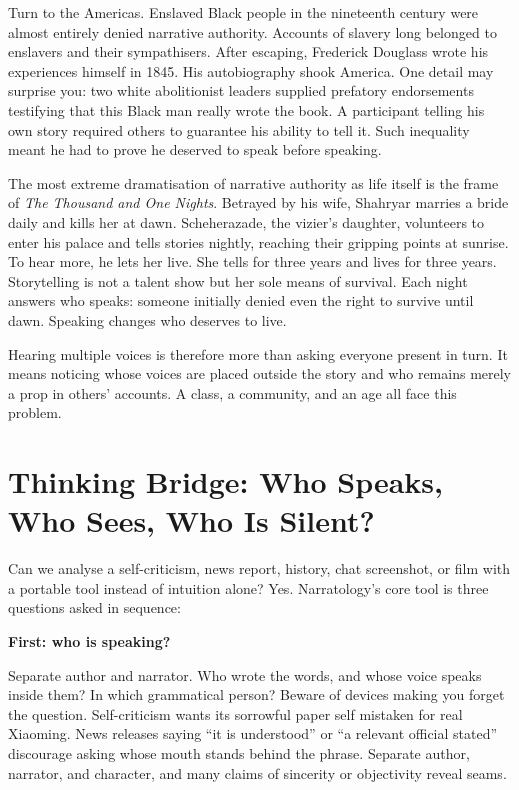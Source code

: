 Turn to the Americas. Enslaved Black people in the nineteenth century were almost entirely denied narrative authority. Accounts of slavery long belonged to enslavers and their sympathisers. After escaping, Frederick Douglass wrote his experiences himself in 1845. His autobiography shook America. One detail may surprise you: two white abolitionist leaders supplied prefatory endorsements testifying that this Black man really wrote the book. A participant telling his own story required others to guarantee his ability to tell it. Such inequality meant he had to prove he deserved to speak before speaking.

The most extreme dramatisation of narrative authority as life itself is the frame of \emph{The Thousand and One Nights}. Betrayed by his wife, Shahryar marries a bride daily and kills her at dawn. Scheherazade, the vizier's daughter, volunteers to enter his palace and tells stories nightly, reaching their gripping points at sunrise. To hear more, he lets her live. She tells for three years and lives for three years. Storytelling is not a talent show but her sole means of survival. Each night answers who speaks: someone initially denied even the right to survive until dawn. Speaking changes who deserves to live.

Hearing multiple voices is therefore more than asking everyone present in turn. It means noticing whose voices are placed outside the story and who remains merely a prop in others' accounts. A class, a community, and an age all face this problem.

\section[Thinking Bridge: Three Narrative Questions]{Thinking Bridge: Who Speaks, Who Sees, Who Is Silent?}
Can we analyse a self-criticism, news report, history, chat screenshot, or film with a portable tool instead of intuition alone? Yes. Narratology's core tool is three questions asked in sequence:

\textbf{First: who is speaking?}

Separate author and narrator. Who wrote the words, and whose voice speaks inside them? In which grammatical person? Beware of devices making you forget the question. Self-criticism wants its sorrowful paper self mistaken for real Xiaoming. News releases saying ``it is understood'' or ``a relevant official stated'' discourage asking whose mouth stands behind the phrase. Separate author, narrator, and character, and many claims of sincerity or objectivity reveal seams.

